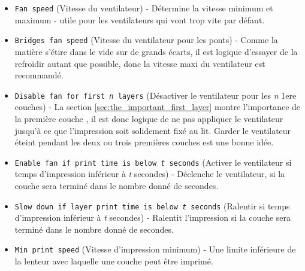 \begin{itemize}
	\item \texttt{Fan speed} (Vitesse du ventilateur) - D\'etermine la vitesse minimum et maximum - utile pour les ventilateurs qui vont trop vite par d\'efaut.
	\item \texttt{Bridges fan speed} (Vitesse du ventilateur pour les ponts) - Comme la mati\`ere s'\'etire dans le vide sur de grands \'ecarts, il est logique d'essayer de la refroidir autant que possible, donc la vitesse maxi du ventilateur est recommand\'e.
	\item \texttt{Disable fan for first \textit{n} layers} (D\'esactiver le ventilateur pour les \textit{n} 1ere couches) - La section \ref{sec:the_important_first_layer} montre l'importance de la premi\`ere couche , il est donc logique de ne pas appliquer le ventilateur jusqu'\`a ce que l'impression soit solidement fix\'e au lit. Garder le ventilateur \'eteint pendant les deux ou trois premi\`eres couches est une bonne id\'ee.
\end{itemize}

\begin{itemize}
	\item \texttt{Enable fan if print time is below \textit{t} seconds}  (Activer le ventilateur si temps d'impression inf\'erieur \`a \textit{t} secondes) - D\'eclenche le ventilateur, si la couche sera termin\'e dans le nombre donn\'e de secondes.
	\item \texttt{Slow down if layer print time is below \textit{t} seconds}  (Ralentir si temps d'impression inf\'erieur \`a \textit{t} secondes) - Ralentit l'impression si la couche sera termin\'e dans le nombre donn\'e de secondes.
	\item \texttt{Min print speed}  (Vitesse d'impression minimum) - Une limite inf\'erieure de la lenteur avec laquelle une couche peut \^etre imprim\'e.
\end{itemize}



